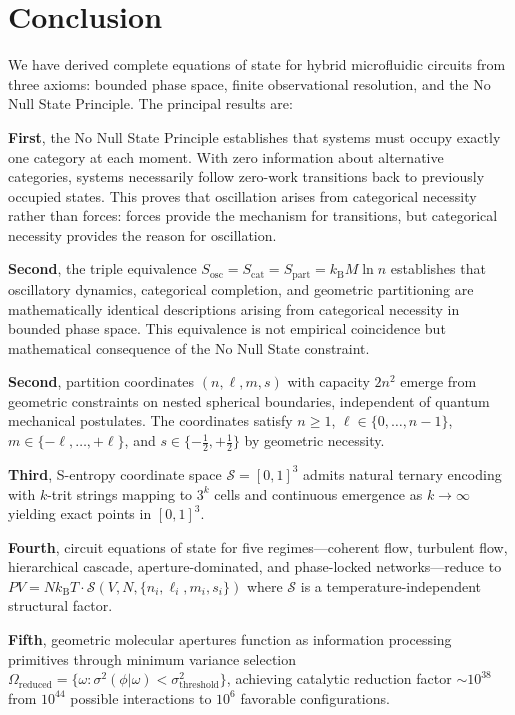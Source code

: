 \documentclass[12pt,a4paper]{article}
\theoremstyle{plain}
\theoremstyle{definition}
\theoremstyle{remark}
\newcommand{\kB}{k_{\mathrm{B}}}
\newcommand{\Sspace}{\mathcal{S}}
\newcommand{\Sosc}{S_{\mathrm{osc}}}
\newcommand{\Scat}{S_{\mathrm{cat}}}
\newcommand{\Spart}{S_{\mathrm{part}}}
\begin{document}
\section{Conclusion}
\label{sec:conclusion}

We have derived complete equations of state for hybrid microfluidic circuits from three axioms: bounded phase space, finite observational resolution, and the No Null State Principle. The principal results are:

\textbf{First}, the No Null State Principle establishes that systems must occupy exactly one category at each moment. With zero information about alternative categories, systems necessarily follow zero-work transitions back to previously occupied states. This proves that oscillation arises from categorical necessity rather than forces: forces provide the mechanism for transitions, but categorical necessity provides the reason for oscillation.

\textbf{Second}, the triple equivalence $\Sosc = \Scat = \Spart = \kB M \ln n$ establishes that oscillatory dynamics, categorical completion, and geometric partitioning are mathematically identical descriptions arising from categorical necessity in bounded phase space. This equivalence is not empirical coincidence but mathematical consequence of the No Null State constraint.

\textbf{Second}, partition coordinates $(n,\ell,m,s)$ with capacity $2n^2$ emerge from geometric constraints on nested spherical boundaries, independent of quantum mechanical postulates. The coordinates satisfy $n \geq 1$, $\ell \in \{0,\ldots,n-1\}$, $m \in \{-\ell,\ldots,+\ell\}$, and $s \in \{-\tfrac{1}{2},+\tfrac{1}{2}\}$ by geometric necessity.

\textbf{Third}, S-entropy coordinate space $\Sspace = [0,1]^3$ admits natural ternary encoding with $k$-trit strings mapping to $3^k$ cells and continuous emergence as $k \to \infty$ yielding exact points in $[0,1]^3$.

\textbf{Fourth}, circuit equations of state for five regimes—coherent flow, turbulent flow, hierarchical cascade, aperture-dominated, and phase-locked networks—reduce to $PV = N\kB T \cdot \mathcal{S}(V,N,\{n_i,\ell_i,m_i,s_i\})$ where $\mathcal{S}$ is a temperature-independent structural factor.

\textbf{Fifth}, geometric molecular apertures function as information processing primitives through minimum variance selection $\Omega_{\text{reduced}} = \{\omega : \sigma^2(\phi|\omega) < \sigma^2_{\text{threshold}}\}$, achieving catalytic reduction factor $\sim 10^{38}$ from $10^{44}$ possible interactions to $10^{6}$ favorable configurations.
\end{document}
